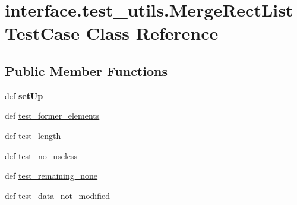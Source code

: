 \hypertarget{classinterface_1_1test__utils_1_1_merge_rect_list_test_case}{\section{interface.\-test\-\_\-utils.\-Merge\-Rect\-List\-Test\-Case \-Class \-Reference}
\label{classinterface_1_1test__utils_1_1_merge_rect_list_test_case}
}
\subsection*{\-Public \-Member \-Functions}
\begin{DoxyCompactItemize}
\item 
\hypertarget{classinterface_1_1test__utils_1_1_merge_rect_list_test_case_ae4989aef5d50da6b3945a9ee05b7a4fc}{def {\bfseries set\-Up}}\label{classinterface_1_1test__utils_1_1_merge_rect_list_test_case_ae4989aef5d50da6b3945a9ee05b7a4fc}

\item 
def \hyperlink{classinterface_1_1test__utils_1_1_merge_rect_list_test_case_a635e6314da087c53f803e5b5361333c9}{test\-\_\-former\-\_\-elements}
\item 
def \hyperlink{classinterface_1_1test__utils_1_1_merge_rect_list_test_case_a1207e7d3aa27e582d1a528f44c127577}{test\-\_\-length}
\item 
def \hyperlink{classinterface_1_1test__utils_1_1_merge_rect_list_test_case_a7886b3266aa6b46b466ea47a5a1d9c18}{test\-\_\-no\-\_\-useless}
\item 
def \hyperlink{classinterface_1_1test__utils_1_1_merge_rect_list_test_case_a696bcc1d1c96d3e80622c9d921576671}{test\-\_\-remaining\-\_\-none}
\item 
def \hyperlink{classinterface_1_1test__utils_1_1_merge_rect_list_test_case_aee6508e378d235f331589c769278cb8e}{test\-\_\-data\-\_\-not\-\_\-modified}
\end{DoxyCompactItemize}
